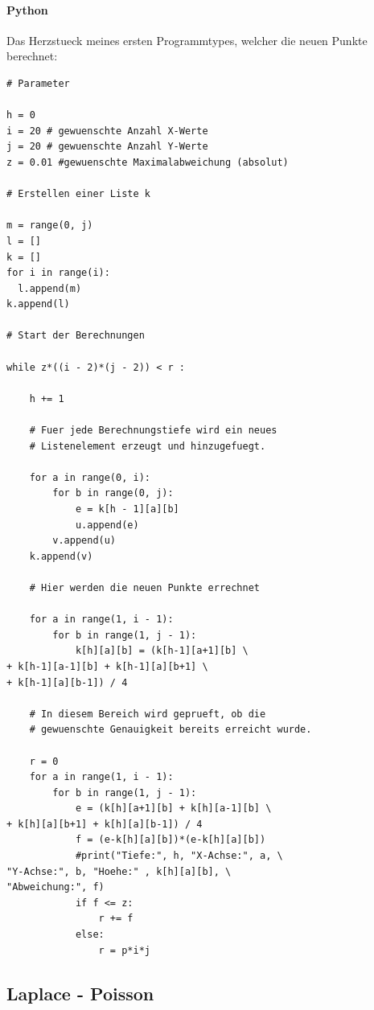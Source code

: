 \documentclass[pdftex,12pt,a4paper]{article}
\begin{document}
\paragraph {Python}

Das Herzstueck meines ersten Programmtypes, welcher die neuen Punkte berechnet:

\begin{lstlisting}
# Parameter

h = 0
i = 20 # gewuenschte Anzahl X-Werte
j = 20 # gewuenschte Anzahl Y-Werte
z = 0.01 #gewuenschte Maximalabweichung (absolut)

# Erstellen einer Liste k

m = range(0, j)
l = []
k = []
for i in range(i):
  l.append(m)
k.append(l)

# Start der Berechnungen

while z*((i - 2)*(j - 2)) < r :
    
    h += 1

    # Fuer jede Berechnungstiefe wird ein neues
    # Listenelement erzeugt und hinzugefuegt.

    for a in range(0, i):
        for b in range(0, j):
            e = k[h - 1][a][b]
            u.append(e)
        v.append(u)
    k.append(v)

    # Hier werden die neuen Punkte errechnet

    for a in range(1, i - 1):
        for b in range(1, j - 1):
            k[h][a][b] = (k[h-1][a+1][b] \
+ k[h-1][a-1][b] + k[h-1][a][b+1] \
+ k[h-1][a][b-1]) / 4

    # In diesem Bereich wird geprueft, ob die 
    # gewuenschte Genauigkeit bereits erreicht wurde.

    r = 0
    for a in range(1, i - 1):
        for b in range(1, j - 1):
            e = (k[h][a+1][b] + k[h][a-1][b] \
+ k[h][a][b+1] + k[h][a][b-1]) / 4
            f = (e-k[h][a][b])*(e-k[h][a][b])
            #print("Tiefe:", h, "X-Achse:", a, \
"Y-Achse:", b, "Hoehe:" , k[h][a][b], \
"Abweichung:", f)
            if f <= z:
                r += f
            else:
                r = p*i*j
\end{lstlisting}

\subsection {Laplace - Poisson}
\end{document}
